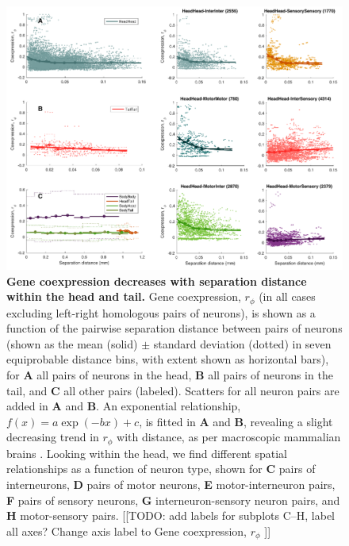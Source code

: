 \documentclass[10pt,letterpaper]{article}
\begin{document}
\begin{figure}[h]
\centering
    \includegraphics[width=1\textwidth]{DistanceCoexpression.pdf}
\caption{
\label{fig:S_distCoexp}
\textbf{Gene coexpression decreases with separation distance within the head and tail.}
Gene coexpression, $r_\phi$ (in all cases excluding left-right homologous pairs of neurons), is shown as a function of the pairwise separation distance between pairs of neurons (shown as the mean (solid) $\pm$ standard deviation (dotted) in seven equiprobable distance bins, with extent shown as horizontal bars), for \textbf{A} all pairs of neurons in the head, \textbf{B} all pairs of neurons in the tail, and \textbf{C} all other pairs (labeled).
Scatters for all neuron pairs are added in \textbf{A} and \textbf{B}.
An exponential relationship, $f(x) = a\exp(-bx)+c$, is fitted in \textbf{A} and \textbf{B}, revealing a slight decreasing trend in $r_\phi$ with distance, as per macroscopic mammalian brains \cite{Fulcher:2016ck, Krienen:2016eq}.
Looking within the head, we find different spatial relationships as a function of neuron type, shown for \textbf{C} pairs of interneurons, \textbf{D} pairs of motor neurons, \textbf{E} motor-interneuron pairs, \textbf{F} pairs of sensory neurons, \textbf{G} interneuron-sensory neuron pairs, and \textbf{H} motor-sensory pairs.
[[TODO: add labels for subplots C--H, label all axes? Change axis label to Gene coexpression, $r_\phi$ ]]
}
\end{figure}
\end{document}
